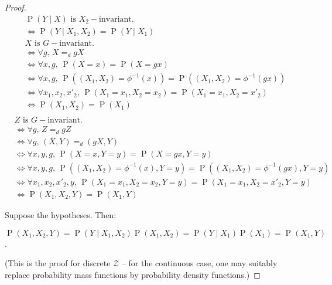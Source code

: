 \documentclass[12pt]{article}
\newcommand{\Prob}[1]{\operatorname{P}\left(#1\right)}
\theoremstyle{definition}
\numberwithin{equation}{section}
\numberwithin{figure}{section}
\numberwithin{table}{section}
\begin{document}
\begin{proof}
    
    \begin{align*}
        & \Prob{Y\mid X}\text{ is }X_2-\text{invariant.} \\
        & \iff \Prob{Y\mid X_1, X_2}=\Prob{Y\mid X_1} \\
        & X\text{ is }G-\text{invariant.} \\ 
        & \iff \forall g, \, X =_d gX \\
        & \iff \forall x, g, \, \Prob{X=x} = \Prob{X = gx} \\
        & \iff \forall x, g, \, \Prob{(X_1, X_2)=\phi^{-1}(x)} = \Prob{(X_1, X_2)=\phi^{-1}(gx)} \\
        & \iff \forall x_1,x_2,x'_2, \, \Prob{X_1=x_1, X_2=x_2}=\Prob{X_1=x_1, X_2=x'_2} \\
        & \iff \Prob{X_1, X_2}=\Prob{X_1} \\
    \end{align*}
    \begin{align*}
        & Z\text{ is }G-\text{invariant.} \\ 
        & \iff \forall g, \, Z =_d gZ \\
        & \iff \forall g, \, (X, Y) =_d (gX, Y) \\
        & \iff \forall x, y, g, \, \Prob{X = x, Y = y} = \Prob{X = gx, Y = y} \\
        & \iff \forall x, y, g, \, \Prob{(X_1, X_2) = \phi^{-1}(x), Y = y} = \Prob{(X_1, X_2) = \phi^{-1}(gx), Y = y} \\
        & \iff \forall x_1, x_2, x'_2, y, \, \Prob{X_1=x_1, X_2=x_2, Y = y} = \Prob{X_1=x_1, X_2=x'_2, Y = y} \\
        & \iff \Prob{X_1, X_2, Y}=\Prob{X_1, Y}
    \end{align*}


    
    Suppose the hypotheses. Then:
    
    $\Prob{X_1, X_2, Y}= \Prob{Y\mid X_1, X_2}\Prob{X_1, X_2} = \Prob{Y\mid X_1}\Prob{X_1}=\Prob{X_1, Y}$.
    
    (This is the proof for discrete $\mathcal{Z}$ -- for the continuous case, one may suitably replace probability mass functions by probability density functions.)
\end{proof}
\end{document}
